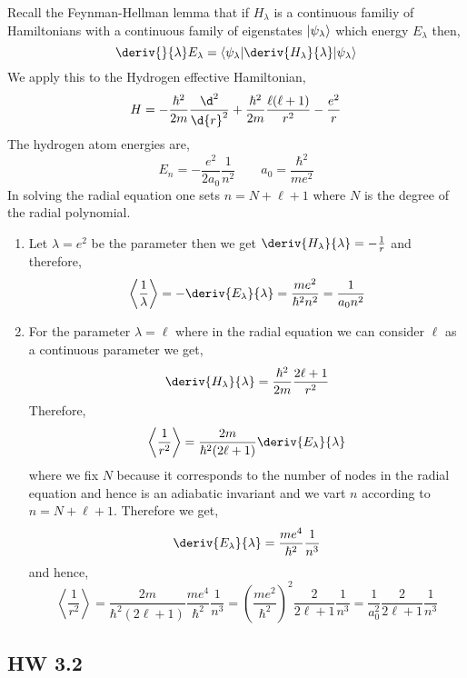 \documentclass[12pt]{article}
\DeclarePairedDelimiter\bra{\langle}{\rvert}
\DeclarePairedDelimiter\ket{\lvert}{\rangle}
\begin{document}
Recall the Feynman-Hellman lemma that if $H_\lambda$ is a continuous familiy of Hamiltonians with a continuous family of eigenstates $\ket{\psi_\lambda}$ which energy $E_\lambda$ then,
\[ \deriv{}{\lambda} E_\lambda = \bra{\psi_\lambda} \deriv{H_\lambda}{\lambda} \ket{\psi_\lambda} \]
We apply this to the Hydrogen effective Hamiltonian,
\[ H = - \frac{\hbar^2}{2m} \frac{\d^2}{\d{r}^2} + \frac{\hbar^2}{2m} \frac{\ell(\ell+1)}{r^2} - \frac{e^2}{r} \]
The hydrogen atom energies are,
\[ E_n = - \frac{e^2}{2a_0} \frac{1}{n^2} \quad \quad a_0 = \frac{\hbar^2}{m e^2} \]
In solving the radial equation one sets $n = N + \ell + 1$ where $N$ is the degree of the radial polynomial. 

\begin{enumerate}
\item Let $\lambda = e^2$ be the parameter then we get $\deriv{H_\lambda}{\lambda} = - \frac{1}{r}$ and therefore,
\[ \left< \frac{1}{\lambda} \right> = - \deriv{E_\lambda}{\lambda} = \frac{m e^2}{\hbar^2 n^2} = \frac{1}{a_0 n^2} \]

\item For the parameter $\lambda = \ell$ where in the radial equation we can consider $\ell$ as a continuous parameter we get,
\[ \deriv{H_\lambda}{\lambda} = \frac{\hbar^2}{2m} \frac{2 \ell + 1}{r^2} \]
Therefore,
\[ \left< \frac{1}{r^2} \right> = \frac{2m}{\hbar^2 (2 \ell + 1)} \deriv{E_\lambda}{\lambda} \]
where we fix $N$ because it corresponds to the number of nodes in the radial equation and hence is an adiabatic invariant and we vart $n$ according to $n = N + \ell + 1$. Therefore we get,
\[ \deriv{E_\lambda}{\lambda} = \frac{m e^4}{ \hbar^2} \frac{1}{n^3} \]
and hence,
\[ \left< \frac{1}{r^2} \right> = \frac{2m}{\hbar^2 (2 \ell + 1)} \frac{m e^4}{ \hbar^2} \frac{1}{n^3} = \left( \frac{m e^2}{\hbar^2} \right)^2 \frac{2}{2 \ell + 1} \frac{1}{n^3} = \frac{1}{a_0^2} \frac{2}{2 \ell + 1} \frac{1}{n^3} \]
\end{enumerate}

\subsection{HW 3.2}
\end{document}
